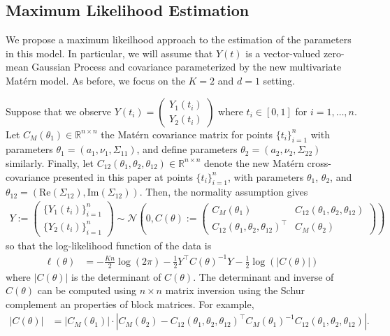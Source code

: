 \documentclass[11pt]{article}
\begin{document}
\subsection{Maximum Likelihood Estimation}\label{sec:ml_est}

We propose a maximum likeilhood approach to the estimation of the parameters in this model. In particular, we will assume that $Y(t)$ is a vector-valued zero-mean Gaussian Process and covariance parameterized by the new multivariate Mat\'ern model. As before, we focus on the $K=2$ and $d=1$ setting. 

Suppose that we observe $Y(t_i) = \begin{pmatrix}Y_1(t_i) \\ Y_2(t_i)\end{pmatrix}$ where $t_i \in [0,1]$ for $i=1, \dots, n$. Let $C_M(\theta_1) \in \mathbb{R}^{n\times n}$ the Mat\'ern covariance matrix for points $\{t_i\}_{i=1}^n$ with parameters $\theta_1 = (a_1, \nu_1, \Sigma_{11})$, and define parameters $\theta_2 = (a_2, \nu_2, \Sigma_{22})$ similarly. Finally, let $C_{12}(\theta_1, \theta_2, \theta_{12}) \in \mathbb{R}^{n\times n}$ denote the new Mat\'ern cross-covariance presented in this paper at points $\{t_i\}_{i=1}^n$, with parameters $\theta_1$, $\theta_2$, and $\theta_{12} = (\textrm{Re}(\Sigma_{12}), \textrm{Im}(\Sigma_{12}))$. Then, the normality assumption gives \begin{align*}
Y:=\begin{pmatrix}
\{Y_1(t_i)\}_{i=1}^n \\
\{Y_2(t_i)\}_{i=1}^n
\end{pmatrix}\sim \mathcal{N}\left(0, C(\theta) := \begin{pmatrix}
C_M(\theta_1) & C_{12}(\theta_1, \theta_2, \theta_{12}) \\
C_{12}(\theta_1, \theta_2, \theta_{12})^\top & C_M(\theta_2)
\end{pmatrix}\right)
\end{align*}so that the log-likelihood function of the data is \begin{align*}
\ell(\theta) &= -\frac{Kn}{2} \log(2\pi) - \frac{1}{2}Y^\top C(\theta)^{-1} Y - \frac{1}{2}\log(|C(\theta)|)
\end{align*}where $|C(\theta)|$ is the determinant of $C(\theta)$. The determinant and inverse of $C(\theta)$ can be computed using $n\times n$ matrix inversion using the Schur complement an properties of block matrices. For example, \begin{align*}
|C(\theta)| &= |C_M(\theta_1)| \cdot |C_M(\theta_2) - C_{12}(\theta_1, \theta_2, \theta_{12})^\top C_M(\theta_1)^{-1}C_{12}(\theta_1, \theta_2, \theta_{12})|.
\end{align*}
\end{document}
